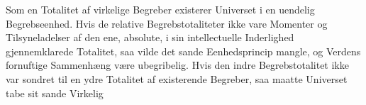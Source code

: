 \documentclass[12pt]{book}
\newcommand{\opage}[1]{\marginnote{\footnotesize\textit{[#1]}}}
\begin{document}
Som en Totalitet af virkelige Begreber existerer Universet i en uendelig
Begrebseenhed.
Hvis de relative Begrebstotaliteter ikke vare Momenter og Tilsyneladelser af den ene,
absolute, i sin intellectuelle Inderlighed gjennemklarede Totalitet, saa vilde det
sande Eenhedsprincip mangle, og Verdens fornuftige Sammenhæng være ubegribelig. Hvis
den indre Begrebstotalitet ikke var sondret til en ydre Totalitet af existerende
Begreber, saa maatte Universet tabe sit sande Virkelig
\opage{179} %
%
%
%
\end{document}
